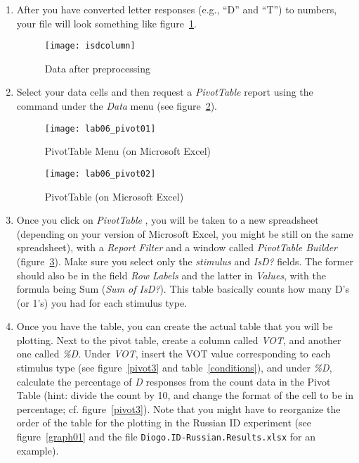 \documentclass{article}
\newcommand{\soft}[1]{\textsf{#1}}
\newcommand{\filefmat}[1]{\texttt{#1}}
\newcommand{\MSExcel}{\soft{Microsoft\texttrademark{} Excel}}
\begin{document}
\begin{enumerate}
\item After you have converted letter responses (e.g., ``D'' and ``T'') to numbers, your file will look something like figure~\ref{isdcolumn}.

\begin{figure}[!tbp]
\caption{Data after preprocessing}
\label{isdcolumn}
	\begin{center}
		\texttt{[image: isdcolumn]}
	\end{center}
\end{figure}

\item Select your data cells and then request a \emph{PivotTable} report using the command under the \emph{Data} menu (see figure~\ref{pivot1}).

\begin{figure}[!tbp]
\caption{PivotTable Menu (on \MSExcel{})}
\label{pivot1}
	\begin{center}
		\texttt{[image: lab06\_pivot01]}
	\end{center}
\end{figure}

\begin{figure}[!tbp]
\caption{PivotTable (on \MSExcel{})}
\label{pivot2}
	\begin{center}
		\texttt{[image: lab06\_pivot02]}
	\end{center}
\end{figure}


\item Once you click on  \emph{PivotTable }, you will be taken to a new spreadsheet (depending on your version of \MSExcel{}, you might be still on the same spreadsheet), with a \emph{Report Filter} and a window called \emph{PivotTable Builder} (figure~\ref{pivot2}). Make sure you select only the \emph{stimulus} and \emph{IsD?} fields. The former should also be in the field \emph{Row Labels} and the latter in \emph{Values}, with the formula being Sum (\emph{Sum of IsD?}). This table basically counts how many D's (or 1's) you had for each stimulus type.

\item Once you have the table, you can create the actual table that you will be plotting. Next to the pivot table, create a column called \emph{VOT}, and another one called \emph{\%D}. Under \emph{VOT}, insert the VOT value corresponding to each stimulus type (see figure~\ref{pivot3} and table~\ref{conditions}), and under \emph{\%D}, calculate the percentage of \emph{D} responses from the count data in the Pivot Table (hint: divide the count by 10, and change the format of the cell to be in percentage; cf. figure~\ref{pivot3}). Note that you might have to reorganize the order of the table for the plotting in the Russian ID experiment (see figure~\ref{graph01} and the file \filefmat{Diogo.ID-Russian.Results.xlsx} for an example).


\end{enumerate}
\end{document}
